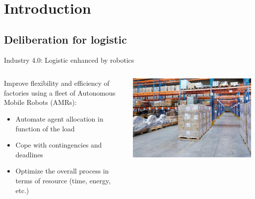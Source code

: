 \section{Introduction}
\subsection{Deliberation for logistic}

\begin{frame}{Industry 4.0: Logistic enhanced by robotics}
    \centering
\begin{columns}
    \begin{column}{0.5\textwidth}
        Improve flexibility and efficiency of factories using a fleet of Autonomous Mobile Robots (AMRs):
        \begin{itemize}
            \item Automate agent allocation in function of the load
            \item Cope with contingencies and deadlines
            \item Optimize the overall process in terms of resource (time, energy, etc.)
        \end{itemize}
    \end{column}
    \begin{column}{0.5\textwidth}
        \includegraphics[width = \textwidth]{images/logisticsolutions.jpg}
    \end{column}
\end{columns}
\end{frame}

